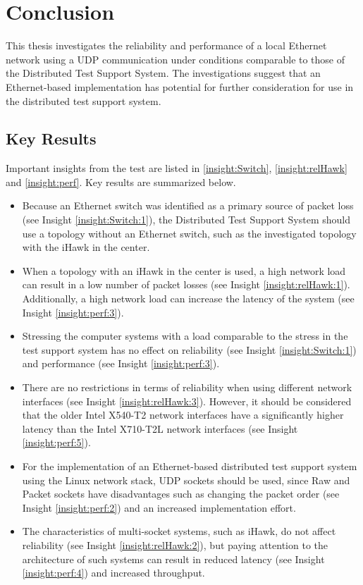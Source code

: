 \chapter{Conclusion} \label{chap:Conclusion}
This thesis investigates the reliability and performance of a local Ethernet network using a UDP communication under conditions comparable to those of the Distributed Test Support System. The investigations suggest that an Ethernet-based implementation has potential for further consideration for use in the distributed test support system.

\section{Key Results} \label{chap:KeyResults}
Important insights from the test are listed in \ref{insight:Switch}, \ref{insight:relHawk} and \ref{insight:perf}. Key results are summarized below.

\begin{itemize}
	\item Because an Ethernet switch was identified as a primary source of packet loss (see Insight \ref{insight:Switch:1}), the Distributed Test Support System should use a topology without an Ethernet switch, such as the investigated topology with the iHawk in the center.
	\item When a topology with an iHawk in the center is used, a high network load can result in a low number of packet losses (see Insight \ref{insight:relHawk:1}). Additionally, a high network load can increase the latency of the system (see Insight \ref{insight:perf:3}).
	\item Stressing the computer systems with a load comparable to the stress in the test support system has no effect on reliability (see Insight \ref{insight:Switch:1}) and performance (see Insight \ref{insight:perf:3}).
	\item There are no restrictions in terms of reliability when using different network interfaces (see Insight \ref{insight:relHawk:3}). However, it should be considered that the older Intel X540-T2 network interfaces have a significantly higher latency than the Intel X710-T2L network interfaces (see Insight \ref{insight:perf:5}).
	\item For the implementation of an Ethernet-based distributed test support system using the Linux network stack, UDP sockets should be used, since Raw and Packet sockets have disadvantages such as changing the packet order (see Insight \ref{insight:perf:2}) and an increased implementation effort.
	\item The characteristics of multi-socket systems, such as iHawk, do not affect reliability (see Insight \ref{insight:relHawk:2}), but paying attention to the architecture of such systems can result in reduced latency (see Insight \ref{insight:perf:4}) and increased throughput.
\end{itemize}



